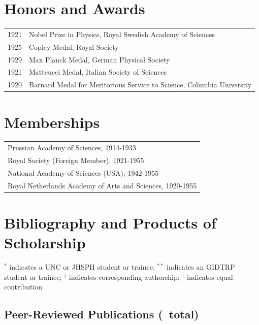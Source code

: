 \documentclass[martgin, line]{article}
\begin{document}
\section*{Honors and Awards}
\begin{tabular}{lp{5.5in}}
1921&
Nobel Prize in Physics, Royal Swedish Academy of Sciences
\\
1925&
Copley Medal, Royal Society
\\
1929&
Max Planck Medal, German Physical Society
\\
1921&
Matteucci Medal, Italian Society of Sciences
\\
1920&
Barnard Medal for Meritorious Service to Science, Columbia University
\\
\end{tabular}


\section*{Memberships}

\begin{tabular}{l}
Prussian Academy of Sciences, 1914-1933\\
Royal Society (Foreign Member), 1921-1955\\
National Academy of Sciences (USA), 1942-1955\\
Royal Netherlands Academy of Arts and Sciences, 1920-1955\\
\end{tabular}


\section*{Bibliography and Products of Scholarship}

\begin{footnotesize}$^*$ indicates a UNC or JHSPH student or trainee;
    $^{**}$ indicates an GIDTRP student or trainee;
    $^\dagger$ indicates corresponding authorship;
    $^\ddagger$ indicates equal contribution
  \end{footnotesize}

\subsection*{Peer-Reviewed Publications (\npeer\ total)} 

\begin{enumerate}
  
\end{enumerate}
\end{document}
